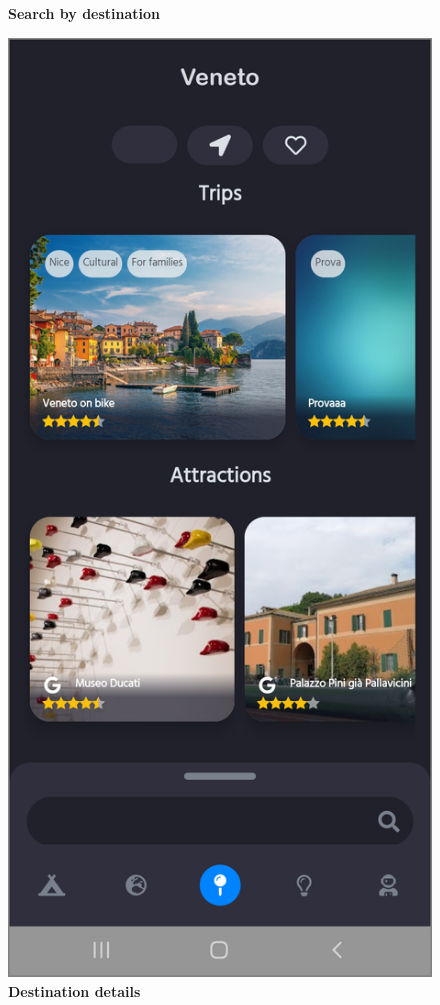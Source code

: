 \begin{figure}[!htb]
\begin{minipage}{.45\textwidth}
\caption{\label{fig:dbapiuser}\textbf{Search by destination}}
\end{minipage} 
\begin{minipage}{.45\textwidth}
\centering
\includegraphics[width=.95\textwidth]{../Images/UI/LocationSearch.jpg}
\caption{\label{fig:dbapiuser}\textbf{Destination details}}
\end{minipage}
\end{figure}


